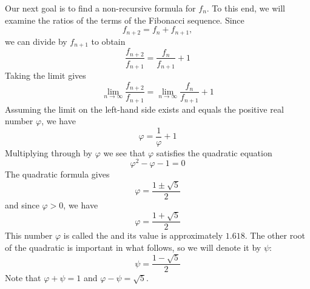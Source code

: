 \documentclass[handout]{ximera}
\begin{document}
Our next goal is to find a non-recursive formula for $f_n$. To this end, 
we will examine the ratios of the terms of the Fibonacci sequence. Since
\[
f_{n+2} = f_n + f_{n+1},
\]
we can divide by $f_{n+1}$ to obtain
\[
\frac{f_{n+2}}{f_{n+1}} = \frac{f_{n}}{f_{n+1}} + 1
\]
Taking the limit gives
\[
\lim_{n \to \infty} \frac{f_{n+2}}{f_{n+1}} = \lim_{n \to \infty} \frac{f_{n}}{f_{n+1}} + 1
\]
Assuming the limit on the left-hand side exists and equals the positive real number $\varphi$, we have
\[
\varphi = \frac{1}{\varphi} + 1
\]
Multiplying through by $\varphi$ we see that $\varphi$ satisfies the quadratic equation
\[
\varphi^2 -\varphi - 1 =0
\]
The quadratic formula gives 
\[
\varphi = \frac{1 \pm \sqrt 5}{2}
\]
and since $\varphi >0$, we have
\[
\varphi = \frac{1 + \sqrt 5}{2}
\]
This number $\varphi$ is called the  and its value is approximately $1.618$. 
The other root of the quadratic is important in what follows, so we will denote it by $\psi$:
\[
\psi = \frac{1 - \sqrt 5}{2}
\]
Note that $\varphi + \psi = 1$ and $\varphi - \psi = \sqrt 5$.
\end{document}
